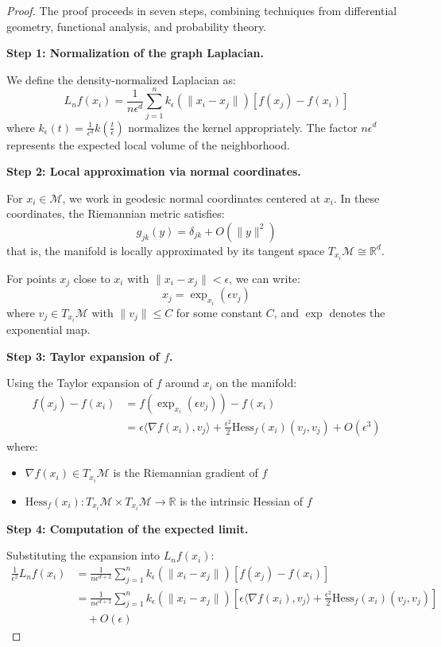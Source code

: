 \begin{proof}
	The proof proceeds in seven steps, combining techniques from differential geometry, functional analysis, and probability theory.

	\textbf{Step 1: Normalization of the graph Laplacian.}

	We define the density-normalized Laplacian as:
	\[
		L_n f(x_i) = \frac{1}{n \epsilon^d} \sum_{j=1}^n k_\epsilon(\|x_i - x_j\|) [f(x_j) - f(x_i)]
	\]
	where $k_\epsilon(t) = \frac{1}{\epsilon^d} k\left(\frac{t}{\epsilon}\right)$ normalizes the kernel appropriately. The factor $n\epsilon^d$ represents the expected local volume of the neighborhood.

	\textbf{Step 2: Local approximation via normal coordinates.}

	For $x_i \in \mathcal{M}$, we work in geodesic normal coordinates centered at $x_i$. In these coordinates, the Riemannian metric satisfies:
	\[
		g_{jk}(y) = \delta_{jk} + O(\|y\|^2)
	\]
	that is, the manifold is locally approximated by its tangent space $T_{x_i}\mathcal{M} \cong \mathbb{R}^d$.

	For points $x_j$ close to $x_i$ with $\|x_i - x_j\| < \epsilon$, we can write:
	\[
		x_j = \exp_{x_i}(\epsilon v_j)
	\]
	where $v_j \in T_{x_i}\mathcal{M}$ with $\|v_j\| \leq C$ for some constant $C$, and $\exp$ denotes the exponential map.

	\textbf{Step 3: Taylor expansion of $f$.}

	Using the Taylor expansion of $f$ around $x_i$ on the manifold:
	\begin{align}
		f(x_j) - f(x_i) &= f(\exp_{x_i}(\epsilon v_j)) - f(x_i)\\
		&= \epsilon \langle \nabla f(x_i), v_j \rangle + \frac{\epsilon^2}{2} \text{Hess}_f(x_i)(v_j, v_j) + O(\epsilon^3)
	\end{align}
	where:
	\begin{itemize}
		\item $\nabla f(x_i) \in T_{x_i}\mathcal{M}$ is the Riemannian gradient of $f$
		\item $\text{Hess}_f(x_i): T_{x_i}\mathcal{M} \times T_{x_i}\mathcal{M} \to \mathbb{R}$ is the intrinsic Hessian of $f$
	\end{itemize}

	\textbf{Step 4: Computation of the expected limit.}

	Substituting the expansion into $L_n f(x_i)$:
	\begin{align}
		\frac{1}{\epsilon^2} L_n f(x_i) &= \frac{1}{n \epsilon^{d+2}} \sum_{j=1}^n k_\epsilon(\|x_i - x_j\|) [f(x_j) - f(x_i)]\\
		&= \frac{1}{n \epsilon^{d+2}} \sum_{j=1}^n k_\epsilon(\|x_i - x_j\|) \left[\epsilon \langle \nabla f(x_i), v_j \rangle + \frac{\epsilon^2}{2} \text{Hess}_f(x_i)(v_j,v_j)\right]\\
		&\quad + O(\epsilon)
	\end{align}


\end{proof}
